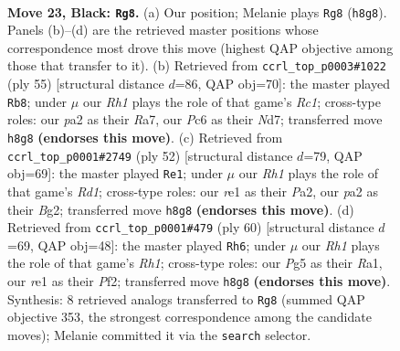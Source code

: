 \documentclass[11pt]{article}
\begin{document}
\clearpage

\begin{figure}[p]\centering
\begin{subfigure}{0.46\textwidth}\centering
\resizebox{\linewidth}{!}{%
\newchessgame
\chessboard[
  setfen={1rb1k2r/p1p2p2/2pqp2p/6p1/2P1Q3/3B4/P7/R2KR3 b k - 1 23},
  showmover=false,
  pgfstyle=straightmove, color=movearrow, markmove={h8-g8}
]}
\caption{}
\end{subfigure}\hfill
\begin{subfigure}{0.46\textwidth}\centering
\resizebox{\linewidth}{!}{%
\newchessgame
\chessboard[
  setfen={2r3k1/r2n1pp1/5q1p/2p5/2Q2P2/4P2P/5PB1/2RR2K1 b - - 0 28},
  showmover=false,
  pgfstyle=straightmove, color=movearrow, markmove={c8-b8}
]}
\caption{}
\end{subfigure}
\\[4pt]
\begin{subfigure}{0.46\textwidth}\centering
\resizebox{\linewidth}{!}{%
\newchessgame
\chessboard[
  setfen={3r3k/1b3pp1/pp1q3p/3P4/Q7/6P1/P4PBP/3R2K1 w - - 0 27},
  showmover=false,
  pgfstyle=straightmove, color=movearrow, markmove={d1-e1}
]}
\caption{}
\end{subfigure}\hfill
\begin{subfigure}{0.46\textwidth}\centering
\resizebox{\linewidth}{!}{%
\newchessgame
\chessboard[
  setfen={r3r2k/1b5P/5p2/1p1q2p1/p2P4/B1P3Q1/5PP1/R5KR w - - 5 31},
  showmover=false,
  pgfstyle=straightmove, color=movearrow, markmove={h1-h6}
]}
\caption{}
\end{subfigure}
\caption{\textbf{Move 23, Black: \texttt{Rg8}.} (a) Our position; Melanie plays \texttt{Rg8} (\texttt{h8g8}). Panels (b)--(d) are the retrieved master positions whose correspondence most drove this move (highest QAP objective among those that transfer to it). (b) Retrieved from \texttt{ccrl\_top\_p0003\#1022} (ply 55) [structural distance $d$=86, QAP obj=70]: the master played \texttt{Rb8}; under $\mu$ our \emph{Rh1} plays the role of that game's \emph{Rc1}; cross-type roles: our \emph{p}a2 as their \emph{R}a7, our \emph{P}c6 as their \emph{N}d7; transferred move \texttt{h8g8} \textbf{(endorses this move)}. (c) Retrieved from \texttt{ccrl\_top\_p0001\#2749} (ply 52) [structural distance $d$=79, QAP obj=69]: the master played \texttt{Re1}; under $\mu$ our \emph{Rh1} plays the role of that game's \emph{Rd1}; cross-type roles: our \emph{r}e1 as their \emph{P}a2, our \emph{p}a2 as their \emph{B}g2; transferred move \texttt{h8g8} \textbf{(endorses this move)}. (d) Retrieved from \texttt{ccrl\_top\_p0001\#479} (ply 60) [structural distance $d$=69, QAP obj=48]: the master played \texttt{Rh6}; under $\mu$ our \emph{Rh1} plays the role of that game's \emph{Rh1}; cross-type roles: our \emph{P}g5 as their \emph{R}a1, our \emph{r}e1 as their \emph{P}f2; transferred move \texttt{h8g8} \textbf{(endorses this move)}. Synthesis: 8 retrieved analogs transferred to \texttt{Rg8} (summed QAP objective 353, the strongest correspondence among the candidate moves); Melanie committed it via the \texttt{search} selector.}
\label{fig:thought-m45}
\end{figure}
\end{document}

